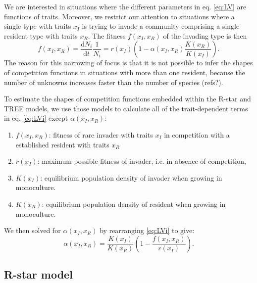 \documentclass[a4paper,11pt]{article}
\newcommand{\ud}{\ensuremath{\mathrm{d}}}
\newcommand{\Rstar}{\ensuremath{R^*}}
\begin{document}
We are interested in situations where the different parameters in eq.
\ref{eq:LV} are functions  of traits. Moreover, we restrict our
attention to situations where a single type with traits
$x_I$ is trying to invade a community comprising a single resident type with
traits $x_R$.  The fitness $f(x_I, x_R)$ of the invading type is
then
\begin{equation}
  \label{eq:LVi}
   f(x_I, x_R) = \frac{\ud N_i}{\ud t} \frac{1}{N_i} =
    r(x_I)\left(1 - \alpha(x_I, x_R) \frac{K(x_R)}{K(x_I)}\right).
\end{equation}
The reason for this narrowing of focus is that it is not possible to
infer the shapes of competition functions in situations with more than one
resident, because the number of unknowns increases faster than the number of
species (refs?).

To estimate the shapes of competition functions embedded within the R-star
and TREE models, we use those models to calculate all of the trait-dependent
terms in eq. \ref{eq:LVi} except $\alpha(x_I, x_R)$:
\begin{enumerate}
  \item $f(x_I, x_R)$: fitness of rare invader with traits $x_I$  in competition
  with a established resident with traits $x_R$
  \item $r(x_I)$: maximum possible fitness of invader, i.e. in absence of competition,
  \item $K(x_I)$: equilibrium population density of invader when growing in monoculture.
  \item $K(x_R)$: equilibrium population density of resident when growing in
  monoculture.
\end{enumerate}
We then solved for $\alpha(x_I, x_R)$ by rearranging  \ref{eq:LVi} to give:
\begin{equation}
  \label{eq:alpha}
 \alpha(x_I, x_R) = \frac{K(x_I)}{K(x_R)}
  \left(1 - \frac{f(x_I, x_R)}{r(x_I)}\right).
\end{equation}

\subsection{R-star model}

\end{document}
